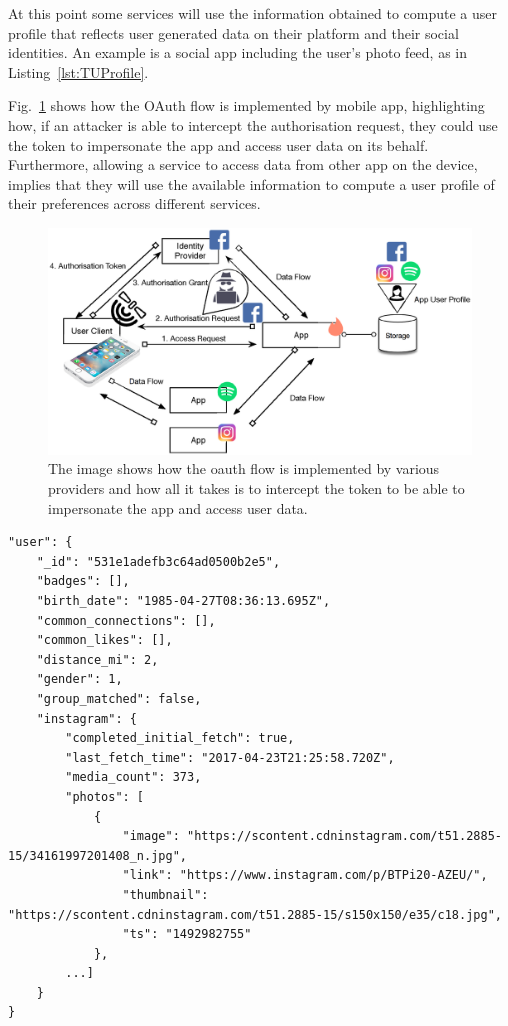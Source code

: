At this point some services will use the information obtained to compute a user profile that reflects user generated data on their platform and their social identities. An example is a social app including the user's photo feed, as in Listing~\ref{lst:TUProfile}.

Fig.~\ref{fig:oauth-weak} shows how the OAuth flow is implemented by mobile app, highlighting how, if an attacker is able to intercept the authorisation request, they could use the token to impersonate the app and access user data on its behalf. Furthermore, allowing a service to access data from other app on the device, implies that they will use the available information to compute a user profile of their preferences across different services.

\begin{figure}
\includegraphics[width=\textwidth]{figures/oauth-weak-points.eps}
\caption[OAuth 2.0 pain points.]{The image shows how the oauth flow is implemented by various providers and how all it takes is to intercept the token to be able to impersonate the app and access user data.
\label{fig:oauth-weak}}
\end{figure}

\begin{lstlisting}
"user": {
    "_id": "531e1adefb3c64ad0500b2e5",
    "badges": [],
    "birth_date": "1985-04-27T08:36:13.695Z",                
    "common_connections": [],
    "common_likes": [],
    "distance_mi": 2,
    "gender": 1,
    "group_matched": false,
    "instagram": {
        "completed_initial_fetch": true,
        "last_fetch_time": "2017-04-23T21:25:58.720Z",
        "media_count": 373,
        "photos": [
            {
                "image": "https://scontent.cdninstagram.com/t51.2885-15/34161997201408_n.jpg",
                "link": "https://www.instagram.com/p/BTPi20-AZEU/",
                "thumbnail": "https://scontent.cdninstagram.com/t51.2885-15/s150x150/e35/c18.jpg",
                "ts": "1492982755"
            },
        ...]
    }
}
\end{lstlisting}

